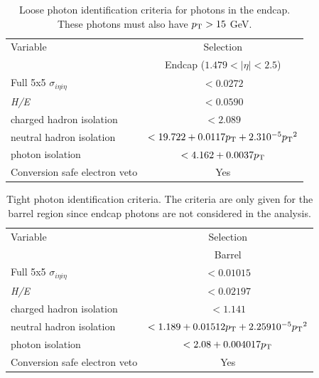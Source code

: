 \begin{table}[htb!]
    \centering
    \small
    \def\arraystretch{1.2}
    \begin{tabular}{l c}
    \hline
    Variable                                   &  Selection       \\
                                               &  Endcap ($1.479<|\eta|<2.5$)  \\
    \hline
    \hline
    Full 5x5 $\sigma_{i\eta i\eta}$            & $< 0.0272 $    \\
    \textit{H/E}                               & $< 0.0590 $    \\
    charged hadron isolation                   & $< 2.089 $     \\
    neutral hadron isolation                   & $< 19.722 + 0.0117 p_{\textrm{T}}+2.3 10^{-5} {p_{\textrm{T}}}^2$ \\
    photon isolation                           & $< 4.162 + 0.0037 p_{\textrm{T}}$  \\
    Conversion safe electron veto              & Yes           \\
    \hline
    \end{tabular}
    \caption{Loose photon identification criteria for photons in the endcap. These photons must also have $p_{\textrm{T}} > 15$ GeV.}
    \label{tab:PhotonIDLooseEndcap}
\end{table}

\begin{table}[htb!]
    \centering
    \small
    \def\arraystretch{1.2}
    \begin{tabular}{l c}
    \hline
    Variable                                   &  Selection       \\
                                               &  Barrel  \\
    \hline
    \hline
    Full 5x5 $\sigma_{i\eta i\eta}$            & $<  0.01015  $ \\
    \textit{H/E}                               & $<  0.02197  $   \\
    charged hadron isolation                   & $< 1.141  $     \\
    neutral hadron isolation                   & $< 1.189  + 0.01512 p_{\textrm{T}}+2.259 10^{-5} {p_{\textrm{T}}}^2$ \\
    photon isolation                           & $< 2.08 + 0.004017 p_{\textrm{T}}$  \\
    Conversion safe electron veto              & Yes           \\
    \hline
    \end{tabular}
    \caption{Tight photon identification criteria. The criteria are only given for the barrel region since endcap photons are not 
    considered in the analysis.}
    \label{tab:PhotonIDTight}
\end{table}


